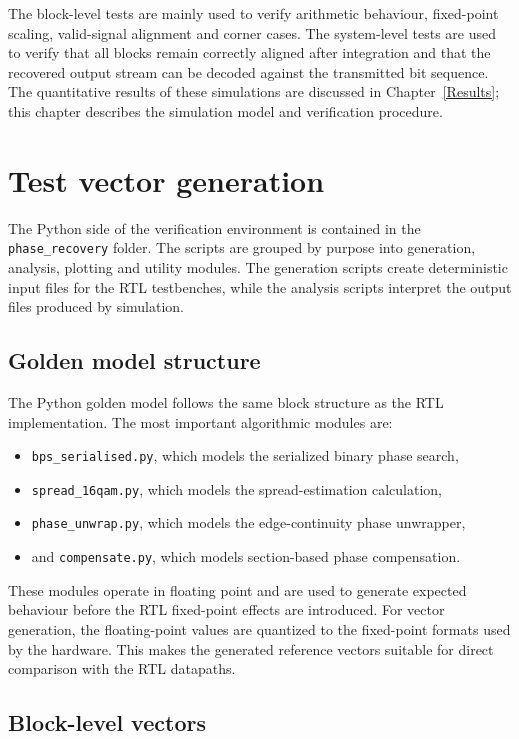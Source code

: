 The block-level tests are mainly used to verify arithmetic behaviour, fixed-point scaling, valid-signal alignment and corner cases. The system-level tests are used to verify that all blocks remain correctly aligned after integration and that the recovered output stream can be decoded against the transmitted bit sequence. The quantitative results of these simulations are discussed in Chapter~\ref{Results}; this chapter describes the simulation model and verification procedure.

\section{Test vector generation}

The Python side of the verification environment is contained in the \texttt{phase\_recovery} folder. The scripts are grouped by purpose into generation, analysis, plotting and utility modules. The generation scripts create deterministic input files for the RTL testbenches, while the analysis scripts interpret the output files produced by simulation.

\subsection{Golden model structure}

The Python golden model follows the same block structure as the RTL implementation. The most important algorithmic modules are:
\begin{itemize}
    \item \texttt{bps\_serialised.py}, which models the serialized binary phase search,
    \item \texttt{spread\_16qam.py}, which models the spread-estimation calculation,
    \item \texttt{phase\_unwrap.py}, which models the edge-continuity phase unwrapper,
    \item and \texttt{compensate.py}, which models section-based phase compensation.
\end{itemize}

These modules operate in floating point and are used to generate expected behaviour before the RTL fixed-point effects are introduced. For vector generation, the floating-point values are quantized to the fixed-point formats used by the hardware. This makes the generated reference vectors suitable for direct comparison with the RTL datapaths.

\subsection{Block-level vectors}

